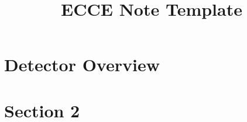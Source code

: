 \documentclass[12pt,twoside]{article}
\title{ECCE Note Template}
\begin{document}
\linenumbers

\pagestyle{empty}



\maketitle
\begin{abstract}
 
\end{abstract}

\setcounter{page}{1}



\tableofcontents


\renewcommand{\thepage}{\arabic{page}}

\section {Detector Overview}
\label{det_overview}


\section {Section 2}
\label{section2}


\listoftodos[To Do]



\end{document}
